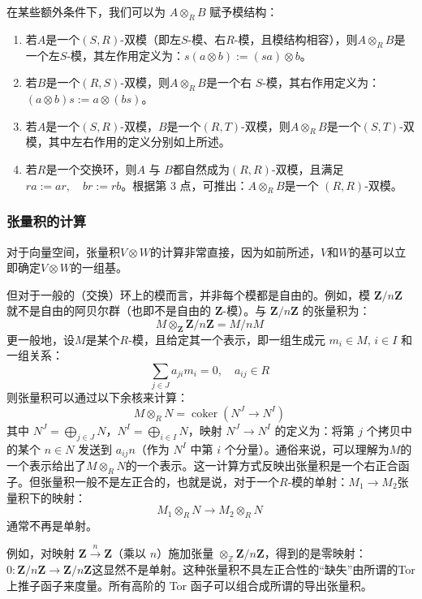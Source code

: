 在某些额外条件下，我们可以为 \( A \otimes_R B \) 赋予模结构：

\begin{enumerate}
\item 若\( A \)是一个\( (S, R) \)-双模（即左\( S \)-模、右\( R \)-模，且模结构相容），则\(A \otimes_R B\)是一个左\( S \)-模，其左作用定义为：\(s(a \otimes b) := (sa) \otimes b\)。
\item 若\( B \)是一个\( (R, S) \)-双模，则\(A \otimes_R B\)是一个右 \( S \)-模，其右作用定义为：\((a \otimes b)s := a \otimes (bs)\)。
\item 若\( A \)是一个\( (S, R) \)-双模，\( B \)是一个\( (R, T) \)-双模，则\(A \otimes_R B \)是一个\( (S, T) \)-双模，其中左右作用的定义分别如上所述。
\item 若\( R \)是一个交换环，则\( A \) 与 \( B \)都自然成为\( (R, R) \)-双模，且满足\(ra := ar, \quad br := rb\)。根据第 3 点，可推出：\(A \otimes_R B\)是一个 \( (R, R) \)-双模。
\end{enumerate}
\subsubsection{张量积的计算}
对于向量空间，张量积\( V \otimes W \)的计算非常直接，因为如前所述，\( V \)和\( W \)的基可以立即确定\( V \otimes W \)的一组基。

但对于一般的（交换）环上的模而言，并非每个模都是自由的。例如，模 \( \mathbf{Z}/n\mathbf{Z} \) 就不是自由的阿贝尔群（也即不是自由的 \( \mathbf{Z} \)-模）。与 \( \mathbf{Z}/n\mathbf{Z} \) 的张量积为：
\[
M \otimes_{\mathbf{Z}} \mathbf{Z}/n\mathbf{Z} = M / nM~
\]
更一般地，设\( M \)是某个\( R \)-模，且给定其一个表示，即一组生成元 \( m_i \in M,\, i \in I \) 和一组关系：
\[
\sum_{j \in J} a_{ji} m_i = 0,\quad a_{ij} \in R~
\]
则张量积可以通过以下余核来计算：
\[
M \otimes_R N = \operatorname{coker}(N^J \to N^I)~
\]
其中 \( N^J = \bigoplus_{j \in J} N \)，\( N^I = \bigoplus_{i \in I} N \)，映射 \( N^J \to N^I \) 的定义为：将第 \( j \) 个拷贝中的某个 \( n \in N \) 发送到 \( a_{ij} n \)（作为 \( N^I \) 中第 \( i \) 个分量）。通俗来说，可以理解为\( M \)的一个表示给出了\( M \otimes_R N \)的一个表示。这一计算方式反映出张量积是一个右正合函子。但张量积一般不是左正合的，也就是说，对于一个\( R \)-模的单射：\(M_1 \to M_2\)张量积下的映射：
\[
M_1 \otimes_R N \to M_2 \otimes_R N~
\]
通常不再是单射。

例如，对映射 \( \mathbf{Z} \xrightarrow{n} \mathbf{Z} \)（乘以 \( n \)）施加张量 \( \otimes_{\mathbb{Z}} \mathbf{Z}/n\mathbf{Z} \)，得到的是零映射：\(0 : \mathbf{Z}/n\mathbf{Z} \to \mathbf{Z}/n\mathbf{Z}\)这显然不是单射。这种张量积不具左正合性的“缺失”由所谓的Tor 上推子函子来度量。所有高阶的 Tor 函子可以组合成所谓的导出张量积。
